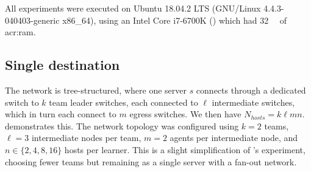 All experiments were executed on Ubuntu 18.04.2 LTS (GNU/Linux 4.4.3-040403-generic x86\_64), using an Intel Core i7-6700K () which had \SI{32}{\gibi\byte} of \gls{acr:ram}.

\subsection{Single destination}\label{sec:single-dest}
The network is tree-structured, where one server $s$ connects through a dedicated switch to $k$ team leader switches, each connected to $\ell$ intermediate switches, which in turn each connect to $m$ egress switches.
We then have $N_{\mathit{hosts}} = k \ell m n$.
 demonstrates this.
The network topology was configured using $k=2$ teams, $\ell=3$ intermediate nodes per team, $m=2$ agents per intermediate node, and $n \in \{2, 4, 8, 16\}$ hosts per learner.
This is a slight simplification of \Textcite{DBLP:journals/eaai/MalialisK15}'s  experiment, choosing fewer teams but remaining as a single server with a fan-out network.

